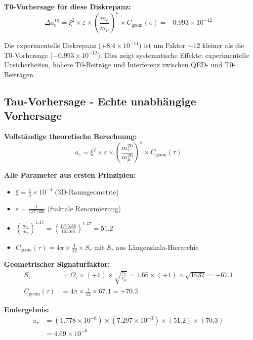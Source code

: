 \documentclass[12pt,a4paper]{article}
\numberwithin{equation}{section}
\newcommand{\xipar}{\xi}
\newcommand{\epsilonT}{\varepsilon}
\newcommand{\Cgeom}{C_{\text{geom}}}
\newcommand{\kappaT}{\kappa}
\newcommand{\Omegafactor}{\Omega}
\begin{document}
	\textbf{T0-Vorhersage für diese Diskrepanz:}
	\begin{equation}
		\Delta a_e^{T0} = \xipar^2 \times \epsilonT \times \left(\frac{m_e}{m_\mu}\right)^{\kappaT} \times \Cgeom(e) = -0.993 \times 10^{-12}
		\label{eq:electron_t0}
	\end{equation}
	
	Die experimentelle Diskrepanz ($+8.4 \times 10^{-14}$) ist um Faktor $\sim 12$ kleiner als die T0-Vorhersage ($-0.993 \times 10^{-12}$). Dies zeigt systematische Effekte: experimentelle Unsicherheiten, höhere T0-Beiträge und Interferenz zwischen QED- und T0-Beiträgen.
	
	\subsection{Tau-Vorhersage - Echte unabhängige Vorhersage}
	
	\textbf{Vollständige theoretische Berechnung:}
	\begin{equation}
		a_\tau = \xipar^2 \times \epsilonT \times \left(\frac{m_\tau^{T0}}{m_\mu^{T0}}\right)^{\kappaT} \times \Cgeom(\tau)
		\label{eq:tau_formula}
	\end{equation}
	
	\textbf{Alle Parameter aus ersten Prinzipien:}
	\begin{itemize}
		\item $\xipar = \frac{4}{3} \times 10^{-4}$ (3D-Raumgeometrie)
		\item $\epsilonT = \frac{1}{137.036}$ (fraktale Renormierung)
		\item $\left(\frac{m_\tau}{m_\mu}\right)^{1.47} = \left(\frac{1776.86}{105.66}\right)^{1.47} = 51.2$
		\item $\Cgeom(\tau) = 4\pi \times \frac{1}{12} \times S_\tau$ mit $S_\tau$ aus Längenskala-Hierarchie
	\end{itemize}
	
	\textbf{Geometrischer Signaturfaktor:}
	\begin{align}
		S_\tau &= \Omegafactor_\tau \times (+1) \times \sqrt{\frac{r_\tau}{r_\mu}} = 1.66 \times (+1) \times \sqrt{1632} = +67.1\\
		\Cgeom(\tau) &= 4\pi \times \frac{1}{12} \times 67.1 = +70.3
		\label{eq:tau_signature}
	\end{align}
	
	\textbf{Endergebnis:}
	\begin{align}
		a_\tau &= (1.778 \times 10^{-8}) \times (7.297 \times 10^{-3}) \times (51.2) \times (70.3)\\
		&= 4.69 \times 10^{-8}
		\label{eq:tau_basic}
	\end{align}
	
\end{document}
